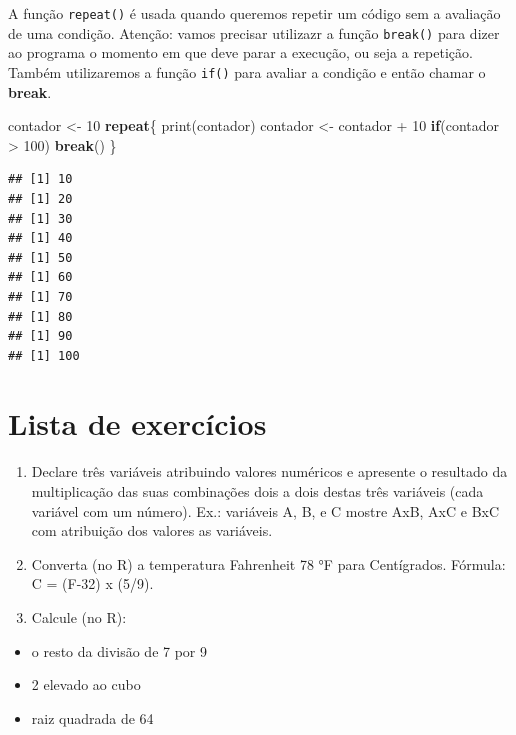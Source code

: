 \documentclass[
]{book}
\newenvironment{Shaded}{\begin{snugshade}}{\end{snugshade}}
\newcommand{\ControlFlowTok}[1]{\textcolor[rgb]{0.13,0.29,0.53}{\textbf{#1}}}
\newcommand{\DecValTok}[1]{\textcolor[rgb]{0.00,0.00,0.81}{#1}}
\newcommand{\FunctionTok}[1]{\textcolor[rgb]{0.00,0.00,0.00}{#1}}
\newcommand{\NormalTok}[1]{#1}
\newcommand{\OtherTok}[1]{\textcolor[rgb]{0.56,0.35,0.01}{#1}}
\newcommand{\SpecialCharTok}[1]{\textcolor[rgb]{0.00,0.00,0.00}{#1}}
\providecommand{\tightlist}{%
  \setlength{\itemsep}{0pt}\setlength{\parskip}{0pt}}
\begin{document}
A função \texttt{repeat()} é usada quando queremos repetir um código sem a avaliação de uma condição. Atenção: vamos precisar utilizazr a função \texttt{break()} para dizer ao programa o momento em que deve parar a execução, ou seja a repetição. Também utilizaremos a função \texttt{if()} para avaliar a condição e então chamar o \textbf{break}.

\begin{Shaded}
\begin{Highlighting}[]
\NormalTok{contador }\OtherTok{\textless{}{-}} \DecValTok{10}
\ControlFlowTok{repeat}\NormalTok{\{}
  \FunctionTok{print}\NormalTok{(contador)}
\NormalTok{  contador }\OtherTok{\textless{}{-}}\NormalTok{ contador }\SpecialCharTok{+} \DecValTok{10}
  \ControlFlowTok{if}\NormalTok{(contador }\SpecialCharTok{\textgreater{}} \DecValTok{100}\NormalTok{) }\ControlFlowTok{break}\NormalTok{()}
\NormalTok{\}}
\end{Highlighting}
\end{Shaded}

\begin{verbatim}
## [1] 10
## [1] 20
## [1] 30
## [1] 40
## [1] 50
## [1] 60
## [1] 70
## [1] 80
## [1] 90
## [1] 100
\end{verbatim}

\hypertarget{lista-de-exercuxedcios}{%
\section{Lista de exercícios}\label{lista-de-exercuxedcios}}

\begin{enumerate}
\def\labelenumi{\arabic{enumi}.}
\item
  Declare três variáveis atribuindo valores numéricos e apresente o resultado da multiplicação das suas combinações dois a dois destas três variáveis (cada variável com um número). Ex.: variáveis A, B, e C mostre AxB, AxC e BxC com atribuição dos valores as variáveis.
\item
  Converta (no R) a temperatura Fahrenheit 78 °F para Centígrados. Fórmula: C = (F-32) x (5/9).
\item
  Calcule (no R):
\end{enumerate}

\begin{itemize}
\tightlist
\item
  o resto da divisão de 7 por 9
\item
  2 elevado ao cubo
\item
  raiz quadrada de 64
\end{itemize}
\end{document}
